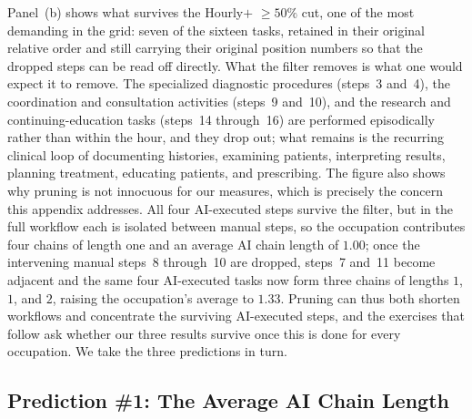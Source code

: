 Panel~(b) shows what survives the Hourly$+$ $\geq 50\%$ cut, one of the most demanding in the grid: seven of the sixteen tasks, retained in their original relative order and still carrying their original position numbers so that the dropped steps can be read off directly.
What the filter removes is what one would expect it to remove.
The specialized diagnostic procedures (steps~3 and~4), the coordination and consultation activities (steps~9 and~10), and the research and continuing-education tasks (steps~14 through~16) are performed episodically rather than within the hour, and they drop out; what remains is the recurring clinical loop of documenting histories, examining patients, interpreting results, planning treatment, educating patients, and prescribing.
The figure also shows why pruning is not innocuous for our measures, which is precisely the concern this appendix addresses.
All four AI-executed steps survive the filter, but in the full workflow each is isolated between manual steps, so the occupation contributes four chains of length one and an average AI chain length of $1.00$; once the intervening manual steps~8 through~10 are dropped, steps~7 and~11 become adjacent and the same four AI-executed tasks now form three chains of lengths $1$, $1$, and $2$, raising the occupation's average to $1.33$.
Pruning can thus both shorten workflows and concentrate the surviving AI-executed steps, and the exercises that follow ask whether our three results survive once this is done for every occupation.
We take the three predictions in turn.


\subsection{Prediction \#1: The Average AI Chain Length}
\label{app:frequency_robustness_chains}

